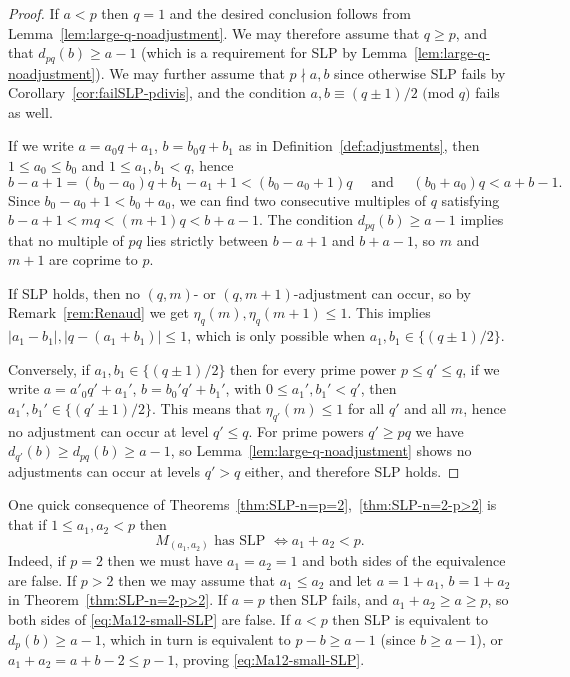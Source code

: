 \documentclass[11pt,reqno]{amsart}
\theoremstyle{definition}
\theoremstyle{remark}
\numberwithin{equation}{section}
\begin{document}
\begin{proof}
    If $a<p$ then $q=1$ and the desired conclusion follows from Lemma~\ref{lem:large-q-noadjustment}. We may therefore assume that $q\geq p$, and that $d_{pq}(b)\geq a-1$ (which is a requirement for SLP by Lemma~\ref{lem:large-q-noadjustment}). We may further assume that $p\nmid a,b$ since otherwise SLP fails by Corollary~\ref{cor:failSLP-pdivis}, and the condition $a,b\equiv (q\pm 1)/2\text{ (mod $q$)}$ fails as well.
    
    If we write $a=a_0q+a_1$, $b=b_0q+b_1$ as in Definition~\ref{def:adjustments}, then $1\leq a_0\leq b_0$ and $1\leq a_1,b_1<q$, hence 
    \[ b-a+1=(b_0-a_0)q+b_1-a_1+1 < (b_0-a_0+1)q\quad\text{ and }\quad (b_0+a_0)q < a+b-1.\]
    Since $b_0-a_0+1<b_0+a_0$, we can find two consecutive multiples of $q$ satisfying $b-a+1<mq<(m+1)q<b+a-1$. The condition $d_{pq}(b)\geq a-1$ implies that no multiple of $pq$ lies strictly between $b-a+1$ and $b+a-1$, so $m$ and $m+1$ are coprime to $p$. 

    If SLP holds, then no $(q,m)$- or $(q,m+1)$-adjustment can occur, so by Remark~\ref{rem:Renaud} we get $\eta_q(m),\eta_q(m+1)\leq 1$. This implies $|a_1-b_1|,|q-(a_1+b_1)|\leq 1$, which is only possible when $a_1,b_1\in\{(q\pm 1)/2\}$.

    Conversely, if $a_1,b_1\in\{(q\pm 1)/2\}$ then for every prime power $p\leq q'\leq q$, if we write $a=a'_0 q'+a_1'$, $b=b_0'q'+b_1'$, with $0\leq a_1',b_1'<q'$, then $a_1',b_1'\in\{(q'\pm 1)/2\}$. This means that $\eta_{q'}(m)\leq 1$ for all $q'$ and all $m$, hence no adjustment can occur at level $q'\leq q$. For prime powers $q'\geq pq$ we have $d_{q'}(b)\geq d_{pq}(b)\geq a-1$, so Lemma~\ref{lem:large-q-noadjustment} shows no adjustments can occur at levels $q'>q$ either, and therefore SLP holds.
\end{proof}

One quick consequence of Theorems~\ref{thm:SLP-n=p=2},~\ref{thm:SLP-n=2-p>2} is that if $1\leq a_1, a_2<p$ then
\begin{equation}\label{eq:Ma12-small-SLP}
    M_{(a_1,a_2)}\text{ has SLP }\Longleftrightarrow a_1+a_2<p.
\end{equation}
Indeed, if $p=2$ then we must have $a_1=a_2=1$ and both sides of the equivalence are false. If $p>2$ then we may assume that $a_1\leq a_2$ and let $a=1+a_1$, $b=1+a_2$ in Theorem~\ref{thm:SLP-n=2-p>2}. If $a=p$ then SLP fails, and $a_1+a_2\geq a\geq p$, so both sides of \eqref{eq:Ma12-small-SLP} are false. If $a<p$ then SLP is equivalent to $d_p(b)\geq a-1$, which in turn is equivalent to $p-b\geq a-1$ (since $b\geq a-1$), or $a_1+a_2=a+b-2\leq p-1$, proving \eqref{eq:Ma12-small-SLP}.
\end{document}
